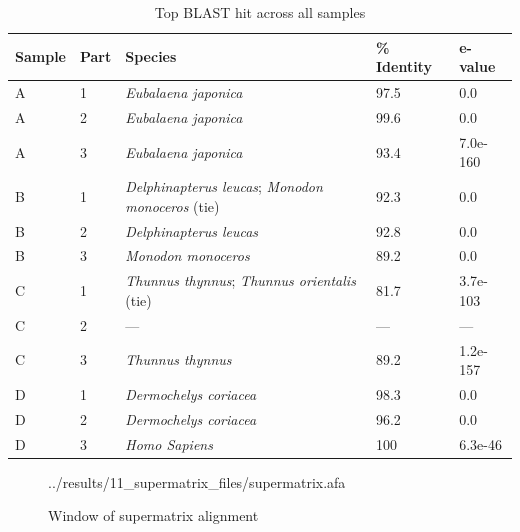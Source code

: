 \documentclass[11pt]{article}
\begin{document}
\begin{table}[htbp]
	\centering
	\caption{Top BLAST hit across all samples}
	\label{tab:blast_hits}
		\footnotesize\sffamily\color{black!80}
		\begin{tabular}{l l l l l}
			\hline
			\textbf{\color{black}Sample} & \textbf{\color{black}Part} & \textbf{\color{black}Species} & \textbf{\color{black}\% Identity} & \textbf{\color{black}e-value} \\
			\hline
			A & 1 & \textit{Eubalaena japonica} & 97.5 & 0.0 \\	
			A & 2 & \textit{Eubalaena japonica} & 99.6 & 0.0 \\
			A & 3 & \textit{Eubalaena japonica} & 93.4 & 7.0e-160 \\
			B & 1 & \textit{Delphinapterus leucas}; \textit{Monodon monoceros} (tie) & 92.3 & 0.0 \\
			B & 2 & \textit{Delphinapterus leucas} & 92.8 & 0.0 \\
			B & 3 & \textit{Monodon monoceros} & 89.2 & 0.0 \\
			C & 1 & \textit{Thunnus thynnus}; \textit{Thunnus orientalis} (tie) & 81.7 & 3.7e-103 \\
			C & 2 & --- & --- & --- \\
			C & 3 & \textit{Thunnus thynnus} & 89.2 & 1.2e-157 \\
			D & 1 & \textit{Dermochelys coriacea} & 98.3 & 0.0 \\
			D & 2 & \textit{Dermochelys coriacea} & 96.2 & 0.0 \\
			D & 3 & \textit{Homo Sapiens} & 100 & 6.3e-46 \\
			
			\hline	
		\end{tabular}
\end{table}

\begin{figure}[H]
	\centering
	\begin{texshade}{../results/11_supermatrix_files/supermatrix.afa}
		\hideconsensus
		\showlegend
	\end{texshade}
	\captionsetup{justification=centering}
	\caption{Window of supermatrix alignment}
\label{fig:supermatrix}
\end{figure} 
\end{document}
